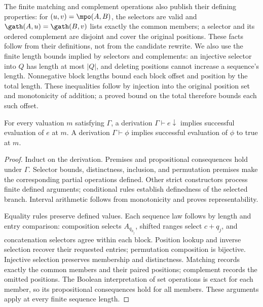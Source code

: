 The finite matching and complement operations also publish their defining
properties: for $(u,v)=\mpo(A,B)$, the selectors are valid and
$\gath(A,u)=\gath(B,v)$ lists exactly the common members; a selector and
its ordered complement are disjoint and cover the original positions.
These facts follow from their definitions, not from the candidate rewrite.
We also use the finite length bounds implied by selectors and complements:
an injective selector into $Q$ has length at most $|Q|$, and deleting
positions cannot increase a sequence's length. Nonnegative block lengths
bound each block offset and position by the total length. These inequalities
follow by injection into the original position set and monotonicity of
addition; a proved bound on the total therefore bounds each such offset.

\begin{lemma}
\label{lem:metadata-soundness}
For every valuation $m$ satisfying $\Gamma$, a derivation
$\Gamma\vdash e\downarrow$ implies successful evaluation of $e$ at $m$.
A derivation $\Gamma\vdash\phi$ implies successful evaluation of $\phi$
to true at $m$.
\end{lemma}
\begin{proof}
Induct on the derivation. Premises and propositional consequences hold
under $\Gamma$. Selector bounds, distinctness, inclusion, and permutation
premises make the corresponding partial operations defined. Other strict
constructors process finite defined arguments; conditional rules establish
definedness of the selected branch. Interval arithmetic follows from
monotonicity and proves representability.

Equality rules preserve defined values. Each sequence law follows by
length and entry comparison: composition selects $A_{q_{h_j}}$, shifted
ranges select $c+q_j$, and concatenation selectors agree within each block.
Position lookup and inverse selection recover their requested entries;
permutation composition is bijective. Injective selection preserves
membership and distinctness. Matching records exactly the common members
and their paired positions; complement records the omitted positions.
The Boolean interpretation of set operations is exact for each member,
so its propositional consequences hold for all members. These arguments
apply at every finite sequence length.
\end{proof}


